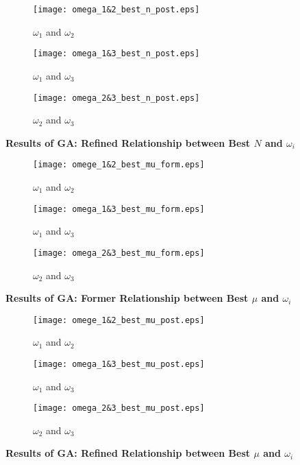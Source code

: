 \documentclass{mcmthesis}
\begin{document}
\begin{figure}[H]
  \centering
  \begin{subfigure}[b]{0.3\textwidth}
      \texttt{[image: omega\_1\&2\_best\_n\_post.eps]}
      \caption{$\omega_1$ and $\omega_2$}
      \label{fig:12Np}
  \end{subfigure}
  \hfill
  \begin{subfigure}[b]{0.3\textwidth}
      \texttt{[image: omega\_1\&3\_best\_n\_post.eps]}
      \caption{$\omega_1$ and $\omega_3$}
      \label{fig:13Np}
  \end{subfigure}
  \hfill
  \begin{subfigure}[b]{0.3\textwidth}
      \texttt{[image: omega\_2\&3\_best\_n\_post.eps]}
      \caption{$\omega_2$ and $\omega_3$}
      \label{fig:23Np}
  \end{subfigure}
  \caption{\textbf{Results of GA: Refined Relationship between Best $N$ and $\omega_i$}}
  \label{fig:Figure9}
\end{figure}

\begin{figure}[H]
  \centering
  \begin{subfigure}[b]{0.3\textwidth}
      \texttt{[image: omege\_1\&2\_best\_mu\_form.eps]}
      \caption{$\omega_1$ and $\omega_2$}
      \label{fig:12muf}
  \end{subfigure}
  \hfill
  \begin{subfigure}[b]{0.3\textwidth}
      \texttt{[image: omega\_1\&3\_best\_mu\_form.eps]}
      \caption{$\omega_1$ and $\omega_3$}
      \label{fig:13muf}
  \end{subfigure}
  \hfill
  \begin{subfigure}[b]{0.3\textwidth}
      \texttt{[image: omega\_2\&3\_best\_mu\_form.eps]}
      \caption{$\omega_2$ and $\omega_3$}
      \label{fig:23muf}
  \end{subfigure}
  \caption{\textbf{Results of GA: Former Relationship between Best $\mu$ and $\omega_i$}}
  \label{fig:Figure10}
\end{figure}

\begin{figure}[H]
  \centering
  \begin{subfigure}[b]{0.3\textwidth}
      \texttt{[image: omege\_1\&2\_best\_mu\_post.eps]}
      \caption{$\omega_1$ and $\omega_2$}
      \label{fig:12mup}
  \end{subfigure}
  \hfill
  \begin{subfigure}[b]{0.3\textwidth}
      \texttt{[image: omega\_1\&3\_best\_mu\_post.eps]}
      \caption{$\omega_1$ and $\omega_3$}
      \label{fig:13mup}
  \end{subfigure}
  \hfill
  \begin{subfigure}[b]{0.3\textwidth}
      \texttt{[image: omega\_2\&3\_best\_mu\_post.eps]}
      \caption{$\omega_2$ and $\omega_3$}
      \label{fig:23mup}
  \end{subfigure}
  \caption{\textbf{Results of GA: Refined Relationship between Best $\mu$ and $\omega_i$}}
  \label{fig:Figure11}
\end{figure}
\end{document}
